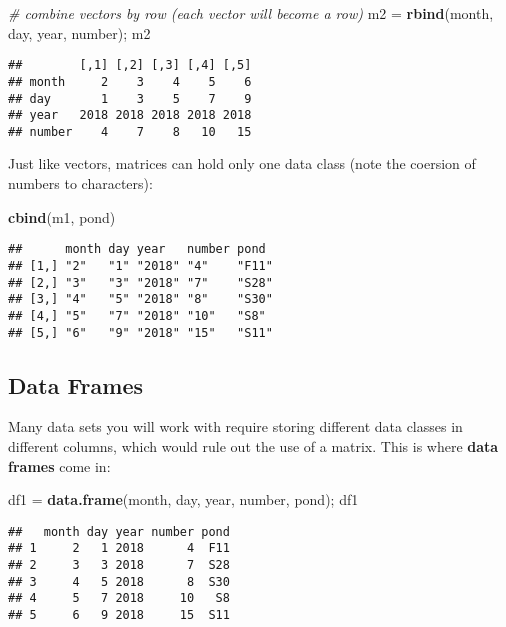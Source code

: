 \documentclass[]{book}
\newenvironment{Shaded}{\begin{snugshade}}{\end{snugshade}}
\newcommand{\KeywordTok}[1]{\textcolor[rgb]{0.13,0.29,0.53}{\textbf{#1}}}
\newcommand{\StringTok}[1]{\textcolor[rgb]{0.31,0.60,0.02}{#1}}
\newcommand{\CommentTok}[1]{\textcolor[rgb]{0.56,0.35,0.01}{\textit{#1}}}
\newcommand{\NormalTok}[1]{#1}
\theoremstyle{definition}
\theoremstyle{definition}
\theoremstyle{definition}
\theoremstyle{remark}
\begin{document}
\begin{Shaded}
\begin{Highlighting}[]
\CommentTok{# combine vectors by row (each vector will become a row)}
\NormalTok{m2 =}\StringTok{ }\KeywordTok{rbind}\NormalTok{(month, day, year, number); m2}
\end{Highlighting}
\end{Shaded}

\begin{verbatim}
##        [,1] [,2] [,3] [,4] [,5]
## month     2    3    4    5    6
## day       1    3    5    7    9
## year   2018 2018 2018 2018 2018
## number    4    7    8   10   15
\end{verbatim}

Just like vectors, matrices can hold only one data class (note the
coersion of numbers to characters):

\begin{Shaded}
\begin{Highlighting}[]
\KeywordTok{cbind}\NormalTok{(m1, pond)}
\end{Highlighting}
\end{Shaded}

\begin{verbatim}
##      month day year   number pond 
## [1,] "2"   "1" "2018" "4"    "F11"
## [2,] "3"   "3" "2018" "7"    "S28"
## [3,] "4"   "5" "2018" "8"    "S30"
## [4,] "5"   "7" "2018" "10"   "S8" 
## [5,] "6"   "9" "2018" "15"   "S11"
\end{verbatim}

\subsection{Data Frames}\label{data-frames}

Many data sets you will work with require storing different data classes
in different columns, which would rule out the use of a matrix. This is
where \textbf{data frames} come in:

\begin{Shaded}
\begin{Highlighting}[]
\NormalTok{df1 =}\StringTok{ }\KeywordTok{data.frame}\NormalTok{(month, day, year, number, pond); df1}
\end{Highlighting}
\end{Shaded}

\begin{verbatim}
##   month day year number pond
## 1     2   1 2018      4  F11
## 2     3   3 2018      7  S28
## 3     4   5 2018      8  S30
## 4     5   7 2018     10   S8
## 5     6   9 2018     15  S11
\end{verbatim}
\end{document}
